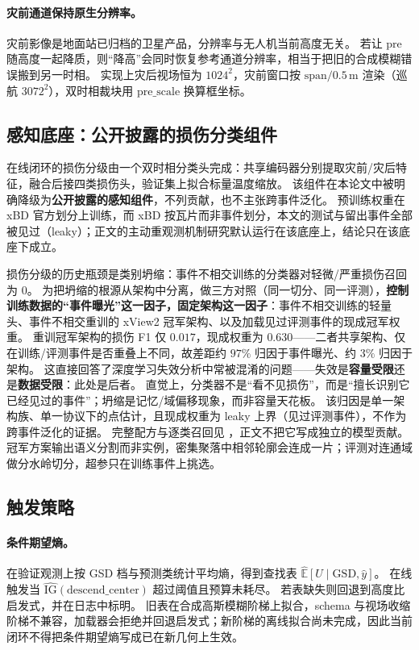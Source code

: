 \paragraph{灾前通道保持原生分辨率。}
灾前影像是地面站已归档的卫星产品，分辨率与无人机当前高度无关。
若让 pre 随高度一起降质，则``降高''会同时恢复参考通道分辨率，相当于把旧的合成模糊错误搬到另一时相。
实现上灾后视场恒为 $1024^2$，灾前窗口按 $\mathrm{span}/0.5\,\mathrm{m}$ 渲染（巡航 $3072^2$），双时相裁块用 $\mathrm{pre\_scale}$ 换算框坐标。

\subsection{感知底座：公开披露的损伤分类组件}
\label{sec:classifier}
在线闭环的损伤分级由一个双时相分类头完成：共享编码器分别提取灾前/灾后特征，融合后接四类损伤头，验证集上拟合标量温度缩放。
该组件在本论文中被明确降级为\textbf{公开披露的感知组件}，不列贡献，也不主张跨事件泛化。
预训练权重在 xBD 官方划分上训练，而 xBD 按瓦片而非事件划分，本文的测试与留出事件全部被见过（leaky）；正文的主动重观测机制研究默认运行在该底座上，结论只在该底座下成立。

损伤分级的历史瓶颈是类别坍缩：事件不相交训练的分类器对轻微/严重损伤召回为 $0$。
为把坍缩的根源从架构中分离，做三方对照（同一切分、同一评测），\textbf{控制训练数据的``事件曝光''这一因子，固定架构这一因子}：事件不相交训练的轻量头、事件不相交重训的 xView2 冠军架构、以及加载见过评测事件的现成冠军权重。
重训冠军架构的损伤 F1 仅 $0.017$，现成权重为 $0.630$——二者共享架构、仅在训练/评测事件是否重叠上不同，故差距约 $97\%$ 归因于事件曝光、约 $3\%$ 归因于架构。
这直接回答了深度学习失效分析中常被混淆的问题——失效是\textbf{容量受限}还是\textbf{数据受限}：此处是后者。
直觉上，分类器不是``看不见损伤''，而是``擅长识别它已经见过的事件''；坍缩是记忆/域偏移现象，而非容量天花板。
该归因是单一架构族、单一协议下的点估计，且现成权重为 leaky 上界（见过评测事件），不作为跨事件泛化的证据。
完整配方与逐类召回见 ，正文不把它写成独立的模型贡献。
冠军方案输出语义分割而非实例，密集聚落中相邻轮廓会连成一片；评测对连通域做分水岭切分，超参只在训练事件上挑选。

\subsection{触发策略}
\label{sec:trigger}
\paragraph{条件期望熵。}
在验证观测上按 GSD 档与预测类统计平均熵，得到查找表 $\widehat{\mathbb{E}}[U\mid\mathrm{GSD},\hat y]$。
在线触发当 $\widehat{\mathrm{IG}}(\mathrm{descend\_center})$ 超过阈值且预算未耗尽。
若表缺失则回退到高度比启发式，并在日志中标明。
旧表在合成高斯模糊阶梯上拟合，schema 与视场收缩阶梯不兼容，加载器会拒绝并回退启发式；新阶梯的离线拟合尚未完成，因此当前闭环不得把条件期望熵写成已在新几何上生效。

